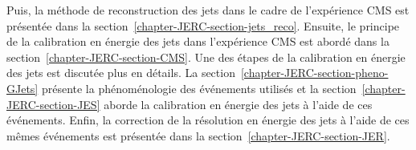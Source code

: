 Puis, la méthode de reconstruction des jets dans le cadre de l'expérience CMS est présentée dans la section~\ref{chapter-JERC-section-jets_reco}.
Ensuite, le principe de la calibration en énergie des jets dans l'expérience CMS est abordé dans la section~\ref{chapter-JERC-section-CMS}.
Une des étapes de la calibration en énergie des jets est discutée plus en détails.
La section~\ref{chapter-JERC-section-pheno-GJets} présente la phénoménologie des événements utilisés et la section~\ref{chapter-JERC-section-JES} aborde la calibration en énergie des jets à l'aide de ces événements.
Enfin, la correction de la résolution en énergie des jets à l'aide de ces mêmes événements est présentée dans la section~\ref{chapter-JERC-section-JER}.